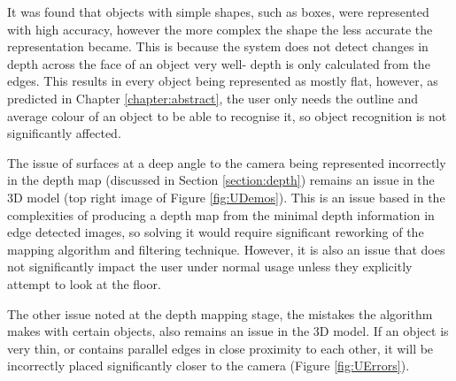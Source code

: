 It was found that objects with simple shapes, such as boxes, were represented with high accuracy, however the more complex the shape the less accurate the representation became. This is because the system does not detect changes in depth across the face of an object very well- depth is only calculated from the edges. This results in every object being represented as mostly flat, however, as predicted in Chapter \ref{chapter:abstract}, the user only needs the outline and average colour of an object to be able to recognise it, so object recognition is not significantly affected.

The issue of surfaces at a deep angle to the camera being represented incorrectly in the depth map (discussed in Section \ref{section:depth}) remains an issue in the 3D model (top right image of Figure \ref{fig:UDemos}). This is an issue based in the complexities of producing a depth map from the minimal depth information in edge detected images, so solving it would require significant reworking of the mapping algorithm and filtering technique. However, it is also an issue that does not significantly impact the user under normal usage unless they explicitly attempt to look at the floor.

The other issue noted at the depth mapping stage, the mistakes the algorithm makes with certain objects, also remains an issue in the 3D model. If an object is very thin, or contains parallel edges in close proximity to each other, it will be incorrectly placed significantly closer to the camera (Figure \ref{fig:UErrors}).

